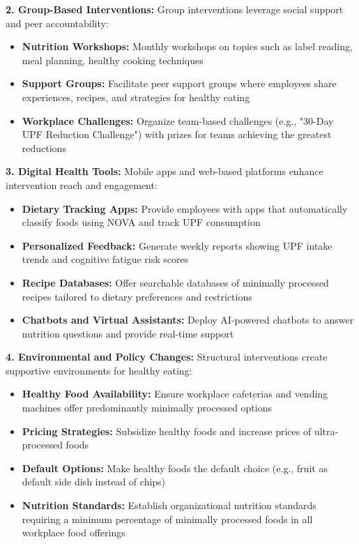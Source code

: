 \documentclass[journal,twoside,10pt]{IEEEtran}
\begin{document}
\textbf{2. Group-Based Interventions:}
Group interventions leverage social support and peer accountability:
\begin{itemize}
\item \textbf{Nutrition Workshops:} Monthly workshops on topics such as label reading, meal planning, healthy cooking techniques
\item \textbf{Support Groups:} Facilitate peer support groups where employees share experiences, recipes, and strategies for healthy eating
\item \textbf{Workplace Challenges:} Organize team-based challenges (e.g., "30-Day UPF Reduction Challenge") with prizes for teams achieving the greatest reductions
\end{itemize}

\textbf{3. Digital Health Tools:}
Mobile apps and web-based platforms enhance intervention reach and engagement:
\begin{itemize}
\item \textbf{Dietary Tracking Apps:} Provide employees with apps that automatically classify foods using NOVA and track UPF consumption
\item \textbf{Personalized Feedback:} Generate weekly reports showing UPF intake trends and cognitive fatigue risk scores
\item \textbf{Recipe Databases:} Offer searchable databases of minimally processed recipes tailored to dietary preferences and restrictions
\item \textbf{Chatbots and Virtual Assistants:} Deploy AI-powered chatbots to answer nutrition questions and provide real-time support
\end{itemize}

\textbf{4. Environmental and Policy Changes:}
Structural interventions create supportive environments for healthy eating:
\begin{itemize}
\item \textbf{Healthy Food Availability:} Ensure workplace cafeterias and vending machines offer predominantly minimally processed options
\item \textbf{Pricing Strategies:} Subsidize healthy foods and increase prices of ultra-processed foods
\item \textbf{Default Options:} Make healthy foods the default choice (e.g., fruit as default side dish instead of chips)
\item \textbf{Nutrition Standards:} Establish organizational nutrition standards requiring a minimum percentage of minimally processed foods in all workplace food offerings
\end{itemize}
\end{document}
